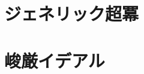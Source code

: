 \documentclass[uplatex]{jsarticle}
\theoremstyle{definition}
\begin{document}
	\section{ジェネリック超冪}
	
	\section{峻厳イデアル}
	
	\nocite{*}
	\printbibliography[title={参考文献}]
	
\end{document}

